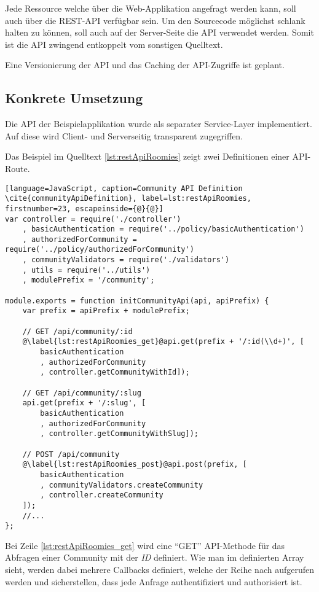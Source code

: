 Jede Ressource welche über die Web-Applikation angefragt werden kann, soll auch über die REST-API verfügbar sein. Um den Sourcecode möglichst schlank halten zu können, soll auch auf der Server-Seite die API verwendet werden.
Somit ist die API zwingend entkoppelt vom sonstigen Quelltext.

Eine Versionierung der API und das Caching der API-Zugriffe ist geplant.

\subsection*{Konkrete Umsetzung}
\label{sec:principle-rp1-rest-concrete-solution}
Die API der Beispielapplikation wurde als separater Service-Layer implementiert. Auf diese wird Client- und Serverseitig transparent zugegriffen.

Das Beispiel im Quelltext \ref{lst:restApiRoomies} zeigt zwei Definitionen einer API-Route.

\begin{lstlisting}[language=JavaScript, caption=Community API Definition \cite{communityApiDefinition}, label=lst:restApiRoomies, firstnumber=23, escapeinside={@}{@}]
var controller = require('./controller')
	, basicAuthentication = require('../policy/basicAuthentication')
	, authorizedForCommunity = require('../policy/authorizedForCommunity')
	, communityValidators = require('./validators')
	, utils = require('../utils')
	, modulePrefix = '/community';

module.exports = function initCommunityApi(api, apiPrefix) {
	var prefix = apiPrefix + modulePrefix;

	// GET /api/community/:id
	@\label{lst:restApiRoomies_get}@api.get(prefix + '/:id(\\d+)', [
		basicAuthentication
		, authorizedForCommunity
		, controller.getCommunityWithId]);

	// GET /api/community/:slug
	api.get(prefix + '/:slug', [
		basicAuthentication
		, authorizedForCommunity
		, controller.getCommunityWithSlug]);

	// POST /api/community
	@\label{lst:restApiRoomies_post}@api.post(prefix, [
		basicAuthentication
		, communityValidators.createCommunity
		, controller.createCommunity
	]);
	//...
};
\end{lstlisting}

Bei Zeile \autoref{lst:restApiRoomies_get} wird eine ``GET'' API-Methode für das Abfragen einer Community mit der \emph{ID} definiert. Wie man im definierten Array sieht, werden dabei mehrere Callbacks definiert, welche der Reihe nach aufgerufen werden und sicherstellen, dass jede Anfrage authentifiziert und authorisiert ist.

